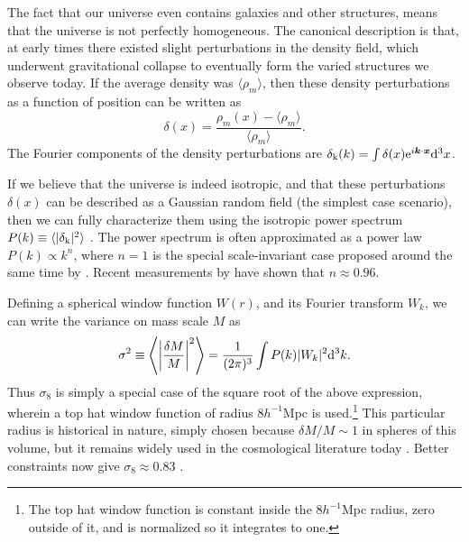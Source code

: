 The fact that our universe even contains galaxies and other structures, means that the universe is not perfectly homogeneous. The canonical description is that, at early times there existed slight perturbations in the density field, which underwent gravitational collapse to eventually form the varied structures we observe today. If the average density was $\langle \rho_m \rangle$, then these density perturbations as a function of position can be written as
\begin{equation}
\delta(x) = \frac{\rho_m(x) - \langle \rho_m \rangle}{\langle \rho_m \rangle}.
\end{equation}
The Fourier components of the density perturbations are $\delta_{\rm k}(k) = \int \delta(x) {\rm e}^{i {\bm k} \cdot {\bm x}}{\rm d}^3x$. 

If we believe that the universe is indeed isotropic, and that these perturbations $\delta(x)$ can be described as a Gaussian random field (the simplest case scenario), then we can fully characterize them using the isotropic power spectrum $P(k) \equiv \langle | \delta_{\rm k} |^2 \rangle$ \citep{Kravtsov12}. The power spectrum is often approximated as a power law $P(k) \propto k^n$, where $n=1$ is the special scale-invariant case proposed around the same time by \citet{Harrison70,PeeblesYu70,Zeldovich72}. Recent measurements by \citet{PlanckXVI} have shown that $n \approx 0.96$.

Defining a spherical window function $W(r)$, and its Fourier transform $W_k$, we can write the variance on mass scale $M$ as 
\begin{equation}
\sigma^2 \equiv \left\langle \left| \frac{\delta M}{M} \right|^2 \right\rangle = \frac{1}{(2\pi)^3} \int P(k) |W_k|^2 {\rm d}^3k.
\end{equation}
Thus $\sigma_8$ is simply a special case of the square root of the above expression, wherein a top hat window function of radius $8 h^{-1}$Mpc is used.\footnote{The top hat window function is constant inside the $8 h^{-1}$Mpc radius, zero outside of it, and is normalized so it integrates to one.} This particular radius is historical in nature, simply chosen because $\delta M/M \sim 1$ in spheres of this volume, but it remains widely used in the cosmological literature today \citep{Voit05}. Better constraints now give $\sigma_8 \approx 0.83$ \citep{PlanckXVI}.

